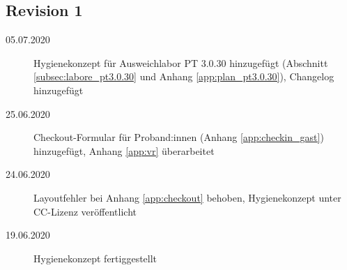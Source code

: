 \documentclass[hidelinks,12pt]{extarticle}
\begin{document}
\subsection*{Revision 1}

\begin{description}
    \item[05.07.2020] Hygienekonzept für Ausweichlabor PT 3.0.30 hinzugefügt (Abschnitt \ref{subsec:labore_pt3.0.30} und Anhang \ref{app:plan_pt3.0.30}), Changelog hinzugefügt
    \item[25.06.2020] Checkout-Formular für Proband:innen (Anhang \ref{app:checkin_gast}) hinzugefügt, Anhang \ref{app:vr} überarbeitet
    \item[24.06.2020] Layoutfehler bei Anhang \ref{app:checkout} behoben, Hygienekonzept unter CC-Lizenz veröffentlicht
    \item[19.06.2020] Hygienekonzept fertiggestellt


\end{description}

\newpage
\tableofcontents 














\end{document}
